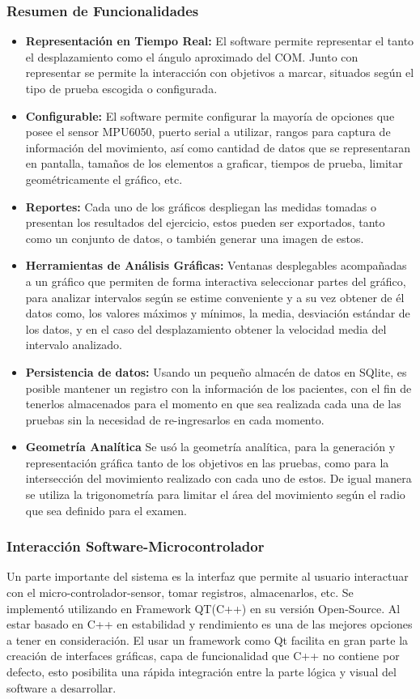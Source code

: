 \documentclass[12pt,a4paper]{article}
\begin{document}
\subsubsection{Resumen de Funcionalidades}
\begin{itemize}
	\item \textbf{Representación en Tiempo Real:} El software permite representar el tanto el desplazamiento como el ángulo aproximado del COM.
	Junto con representar se permite la interacción con objetivos a marcar, situados según el tipo de prueba escogida o configurada.
	\item \textbf{Configurable:} El software permite configurar la mayoría de opciones que posee el sensor MPU6050, puerto serial a utilizar, rangos para captura de información del movimiento, así como cantidad de datos que se representaran en pantalla, tamaños de los elementos a graficar, tiempos de prueba, limitar geométricamente el gráfico, etc.
	\item \textbf{Reportes:} Cada uno de los gráficos despliegan las medidas tomadas o presentan los resultados del ejercicio, estos pueden ser exportados, tanto como un conjunto de datos, o también generar una imagen de estos.
	\item \textbf{Herramientas de Análisis Gráficas:} Ventanas desplegables acompañadas a un gráfico que permiten de forma interactiva seleccionar partes del gráfico, para analizar intervalos según se estime conveniente y a su vez obtener de él datos como, los valores máximos y mínimos, la media, desviación estándar de los datos, y en el caso del desplazamiento obtener la velocidad media del intervalo analizado.
	\item \textbf{Persistencia de datos:} Usando un pequeño almacén de datos en SQlite, es posible mantener un registro con la información de los pacientes, con el fin de tenerlos almacenados para el momento en que sea realizada cada una de las pruebas sin la necesidad de re-ingresarlos en cada momento.
	\item \textbf{Geometría Analítica} Se usó la geometría analítica, para la generación y representación gráfica tanto de los objetivos en las pruebas, como para la intersección del movimiento realizado con cada uno de estos. De igual manera se utiliza la trigonometría para limitar el área del movimiento según el radio que sea definido para el examen.
\end{itemize}
\newpage
\subsubsection{Interacción Software-Microcontrolador}
Un parte importante del sistema es la interfaz que permite al usuario interactuar con el micro-controlador-sensor, tomar registros, almacenarlos, etc.
Se implementó utilizando en Framework QT(C++)\cite{QT} en su versión Open-Source.
Al estar basado en C++ en estabilidad y rendimiento es una de las mejores opciones a tener en consideración.
El usar un framework como Qt facilita en gran parte la creación de interfaces gráficas, capa de funcionalidad que C++ no contiene por defecto, esto posibilita una rápida integración entre la parte lógica y visual del software a desarrollar.
\end{document}
